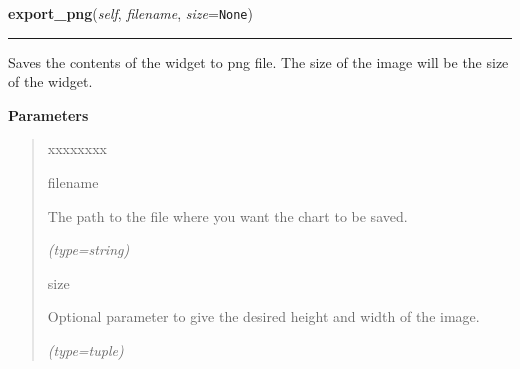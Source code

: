 \hspace{.8\funcindent}\begin{boxedminipage}{\funcwidth}

    \raggedright \textbf{export\_png}(\textit{self}, \textit{filename}, \textit{size}={\tt None})

    \vspace{-1.5ex}

    \rule{\textwidth}{0.5\fboxrule}
\setlength{\parskip}{2ex}
    Saves the contents of the widget to png file. The size of the image 
    will be the size of the widget.

\setlength{\parskip}{1ex}
      \textbf{Parameters}
      \vspace{-1ex}

      \begin{quote}
        \begin{Ventry}{xxxxxxxx}

          \item[filename]

          The path to the file where you want the chart to be saved.

            {\it (type=string)}

          \item[size]

          Optional parameter to give the desired height and width of the 
          image.

            {\it (type=tuple)}

        \end{Ventry}

      \end{quote}

    \end{boxedminipage}

    \label{pygtk_chart:chart:Chart:set_padding}

    \vspace{0.5ex}

